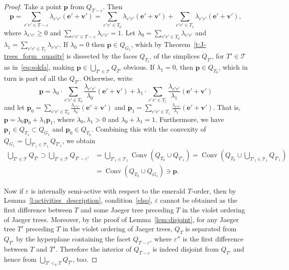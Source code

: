 \documentclass[ALCO,ThmDefs,Unicode,epreuves]{cedram}
\DeclareMathOperator{\conv}{Conv}
\begin{document}
\begin{proof}
Take a point $\mathbf p$ from $Q_{T - \varepsilon}$. Then 
\[\mathbf p=\sum_{e'v'\in T - \varepsilon}\lambda_{e'v'} (\mathbf{e'}+\mathbf{v'})=\sum_{e'v'\in T_0}\lambda_{e'v'} (\mathbf{e'}+\mathbf{v'}) + \sum_{e'v'\in T_1}\lambda_{e'v'} (\mathbf{e'}+\mathbf{v'}),\]
where $\lambda_{e'v'}\geq 0$ and $\sum_{e'v'\in T - \varepsilon}\lambda_{e'v'}=1$. Let $\lambda_0=\sum_{e'v'\in T_0}\lambda_{e'v'}$ and $\lambda_1=\sum_{e'v'\in T_1}\lambda_{e'v'}$. If $\lambda_0=0$ then $\mathbf p\in Q_{G_1}$, which by Theorem~\ref{t:J-trees_form_quasitr} is dissected by the faces $Q_{T_1'}$ of the simplices $Q_{T'}$, for $T'\in\mathcal T$ as in~\eqref{eq:sokfa}, making $\mathbf p\in \bigcup_{T'\in \mathcal{T}}Q_{T'}$ obvious. If $\lambda_1=0$, then $\mathbf p\in Q_{T_0}$, which in turn is part of all the $Q_{T'}$. Otherwise, write
\[\mathbf p=\lambda_0\cdot\sum_{e'v'\in T_0}\frac{\lambda_{e'v'}}{\lambda_0} (\mathbf{e'}+\mathbf{v'}) + \lambda_1\cdot \sum_{e'v'\in T_1}\frac{\lambda_{e'v'}}{\lambda_1} (\mathbf{e'}+\mathbf{v'})\]
and let $\mathbf p_0=\sum_{e'v'\in T_0}\frac{\lambda_{e'v'}}{\lambda_0} (\mathbf{e'}+\mathbf{v'})$ and $\mathbf p_1=\sum_{e'v'\in T_1}\frac{\lambda_{e'v'}}{\lambda_1} (\mathbf{e'}+\mathbf{v'})$. That is, $\mathbf p=\lambda_0\mathbf p_0 + \lambda_1\mathbf p_1$, where $\lambda_0,\lambda_1>0$ and $\lambda_0 + \lambda_1=1$. Furthermore, we have $\mathbf p_1\in Q_{T_1}\subset Q_{G_1}$ and $\mathbf p_0\in Q_{T_0}$. Combining this with the convexity of $Q_{G_1}=\bigcup_{T'_1\in \mathcal{T}_1}Q_{T'_1}$, we obtain
\begin{align*}
\bigcup_{T'\in \mathcal{T}}Q_{T'}\supset \bigcup_{T'\in \mathcal{T}}Q_{T'-\varepsilon'}&=\bigcup_{T'_1\in \mathcal{T}_1} \conv(Q_{T_0}\cup Q_{T'_1})=\conv\left(Q_{T_0}\cup\bigcup_{T'_1\in \mathcal{T}_1}Q_{T'_1}\right)\\
&=\conv(Q_{T_0} \cup Q_{G_1})\ni \mathbf p.
\end{align*}

Now if $\varepsilon$ is internally semi-active with respect to the emerald $T$-order, then by Lemma~\ref{l:activities_description}, condition~\ref{elso}, $\varepsilon$ cannot be obtained as the first difference between $T$ and some Jaeger tree preceding $T$ in the violet ordering of Jaeger trees. Moreover, by the proof of Lemma~\ref{lem:disjoint}, for any Jaeger tree $T'$ preceding $T$ in the violet ordering of Jaeger trees, $Q_{T}$ is separated from $Q_{T'}$ by the hyperplane containing the facet $Q_{T - \varepsilon''}$ where $\varepsilon''$ is the first difference between $T$ and $T'$. Therefore the interior of $Q_{T - \varepsilon}$ is indeed disjoint from $Q_{T'}$ and hence from $\bigcup_{T'<_V T}Q_{T'}$, too. 
\end{proof}
\end{document}
